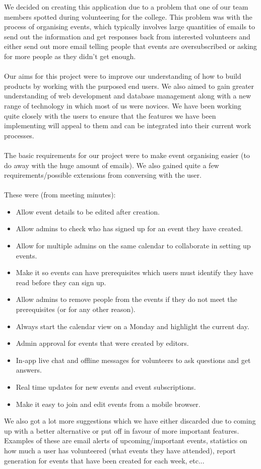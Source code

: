 \documentclass[10pt,a4paper]{article}
\begin{document}
\noindent We decided on creating this application due to a problem that one of 
our team members spotted during volunteering for the college. This problem was 
with the process of organising events, which typically involves large quantities of 
emails to send out the information and get responses back from interested 
volunteers and either send out more email telling people that events are oversubscribed or 
asking for more people as they didn't get enough.
\\
\\
\noindent Our aims for this project were to improve our understanding of how to 
build products by working with the purposed end users. We also aimed to gain 
greater understanding of web development and database management along with a new 
range of technology in which most of us were novices. We have been working quite 
closely with the users to ensure that the features we have been implementing 
will appeal to them and can be integrated into their current work processes.
\\
\\
\noindent The basic requirements for our project were to make event organising 
easier (to do away with the huge amount of emails). We also gained quite a few 
requirements/possible extensions from conversing with the user.
\\
\\
\noindent These were (from meeting minutes):
\begin{itemize}
\setlength\itemsep{0.1em}
\item Allow event details to be edited after creation.
\item Allow admins to check who has signed up for an event they have created.
\item Allow for multiple admins on the same calendar to collaborate in setting 
up events. 
\item Make it so events can have prerequisites which users must identify they 
have read before they can sign up.
\item Allow admins to remove people from the events if they do not meet the 
prerequisites (or for any other reason).
\item Always start the calendar view on a Monday and highlight the current day.
\item Admin approval for events that were created by editors.
\item In-app live chat and offline messages for volunteers to ask questions and 
get answers.
\item Real time updates for new events and event subscriptions.
\item Make it easy to join and edit events from a mobile browser.  
\end{itemize}
\noindent We also got a lot more suggestions which we have either discarded due 
to coming up with a better alternative or put off in favour of more important 
features. Examples of these are email alerts of upcoming/important events, 
statistics on how much a user has volunteered (what events they have attended), 
report generation for events that have been created for each week, etc...
\end{document}
